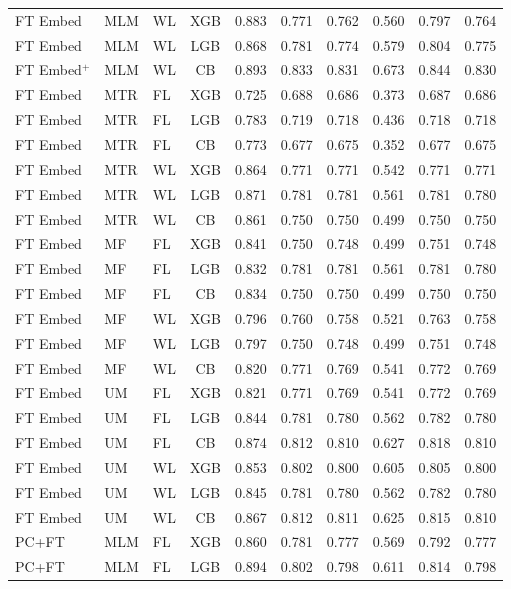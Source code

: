 \documentclass[9pt,a4paper]{article}
\begin{document}
\begin{scriptsize}
\begin{longtable}{lllcrrrrrr}
FT Embed & MLM & WL & XGB & 0.883 & 0.771 & 0.762 & 0.560 & 0.797 & 0.764 \\
FT Embed & MLM & WL & LGB & 0.868 & 0.781 & 0.774 & 0.579 & 0.804 & 0.775 \\
FT Embed$^+$ & MLM & WL & CB & 0.893 & 0.833 & 0.831 & 0.673 & 0.844 & 0.830 \\
FT Embed & MTR & FL & XGB & 0.725 & 0.688 & 0.686 & 0.373 & 0.687 & 0.686 \\
FT Embed & MTR & FL & LGB & 0.783 & 0.719 & 0.718 & 0.436 & 0.718 & 0.718 \\
FT Embed & MTR & FL & CB  & 0.773 & 0.677 & 0.675 & 0.352 & 0.677 & 0.675 \\
FT Embed & MTR & WL & XGB & 0.864 & 0.771 & 0.771 & 0.542 & 0.771 & 0.771 \\
FT Embed & MTR & WL & LGB & 0.871 & 0.781 & 0.781 & 0.561 & 0.781 & 0.780 \\
FT Embed & MTR & WL & CB  & 0.861 & 0.750 & 0.750 & 0.499 & 0.750 & 0.750 \\
FT Embed & MF  & FL & XGB & 0.841 & 0.750 & 0.748 & 0.499 & 0.751 & 0.748 \\
FT Embed & MF  & FL & LGB & 0.832 & 0.781 & 0.781 & 0.561 & 0.781 & 0.780 \\
FT Embed & MF  & FL & CB  & 0.834 & 0.750 & 0.750 & 0.499 & 0.750 & 0.750 \\
FT Embed & MF  & WL & XGB & 0.796 & 0.760 & 0.758 & 0.521 & 0.763 & 0.758 \\
FT Embed & MF  & WL & LGB & 0.797 & 0.750 & 0.748 & 0.499 & 0.751 & 0.748 \\
FT Embed & MF  & WL & CB  & 0.820 & 0.771 & 0.769 & 0.541 & 0.772 & 0.769 \\
FT Embed & UM  & FL & XGB & 0.821 & 0.771 & 0.769 & 0.541 & 0.772 & 0.769 \\
FT Embed & UM  & FL & LGB & 0.844 & 0.781 & 0.780 & 0.562 & 0.782 & 0.780 \\
FT Embed & UM  & FL & CB  & 0.874 & 0.812 & 0.810 & 0.627 & 0.818 & 0.810 \\
FT Embed & UM  & WL & XGB & 0.853 & 0.802 & 0.800 & 0.605 & 0.805 & 0.800 \\
FT Embed & UM  & WL & LGB & 0.845 & 0.781 & 0.780 & 0.562 & 0.782 & 0.780 \\
FT Embed & UM  & WL & CB  & 0.867 & 0.812 & 0.811 & 0.625 & 0.815 & 0.810 \\
\midrule
PC+FT & MLM & FL & XGB & 0.860 & 0.781 & 0.777 & 0.569 & 0.792 & 0.777 \\
PC+FT & MLM & FL & LGB & 0.894 & 0.802 & 0.798 & 0.611 & 0.814 & 0.798 \\

\end{longtable}
\end{scriptsize}
\end{document}
